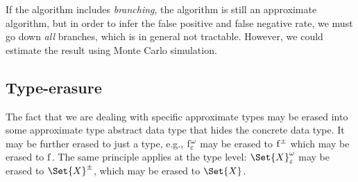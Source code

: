 \documentclass[ ../main.tex]{subfiles}
\begin{document}
If the algorithm includes \emph{branching}, the algorithm is still an approximate algorithm, but in order to infer the false positive and false negative rate, we must go down \emph{all} branches, which is in general not tractable.
However, we could estimate the result using Monte Carlo simulation.

\subsection{Type-erasure}
The fact that we are dealing with specific approximate types may be erased into some approximate type abstract data type that hides the concrete data type.
It may be further erased to just a type, e.g., $\APFun{f}[\fprate][\fnrate]$ may be erased to $\APFun{f}$ which may be erased to $\Fun{f}$.
The same principle applies at the type level: $\AT{\Set{X}}[\fprate][\fnrate]$ may be erased to $\AT{\Set{X}}$, which may be erased to $\Set{X}$.
	
\end{document}
